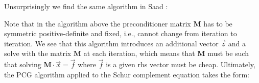 \vspace{.5cm}

Unsurprisingly we find the same algorithm in Saad \cite{saad}:


Note that in the algorithm above the preconditioner matrix ${\bm M}$ 
has to be symmetric positive-definite and fixed, i.e., cannot change from iteration to iteration. 
We see that this algorithm introduces an additional vector $\vec{z}$ and a solve with the 
matrix ${\bm M}$ at each iteration, which means that ${\bm M}$ must 
be such that solving ${\bm M}\cdot \vec{x}= \vec{f}$ 
where $\vec{f}$ is a given rhs vector must be cheap. Ultimately, the PCG algorithm applied to 
the Schur complement equation takes the form:

